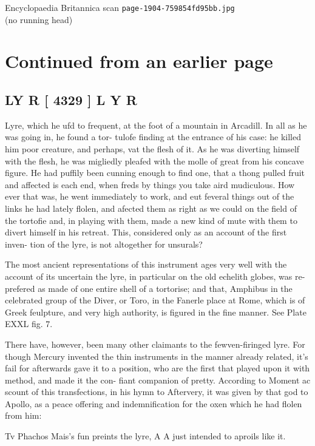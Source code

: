 \documentclass{article}
\begin{document}
\begin{center}
{\Large Encyclopaedia Britannica scan \texttt{page-1904-759854fd95bb.jpg}}\\[0.5em]
(no running head)
\end{center}
\section*{Continued from an earlier page}
\subsection*{LY R [ 4329 ] L Y R}
Lyre, which he ufd to frequent, at the foot of a mountain in Arcadill. In all as he was going in, he found a tor- tulofe finding at the entrance of his case: he killed him poor creature, and perhaps, vat the flesh of it. As he was diverting himself with the flesh, he was migliedly pleafed with the molle of great from his concave figure. He had puffily been cunning enough to find one, that a thong pulled fruit and affected is each end, when freds by things you take aird mudiculous. How ever that was, he went immediately to work, and eut feveral things out of the links he had lately flolen, and afected them as right as we could on the field of the tortofie and, in playing with them, made a new kind of mute with them to divert himself in his retreat. This, considered only as an account of the first inven- tion of the lyre, is not altogether for unsurals?

The most ancient representations of this instrument ages very well with the account of its uncertain the lyre, in particular on the old echelith globes, was re- prefered as made of one entire shell of a tortorise; and that, Amphibus in the celebrated group of the Diver, or Toro, in the Fanerle place at Rome, which is of Greek feulpture, and very high authority, is figured in the fine manner. See Plate EXXL fig. 7.

There have, however, been many other claimants to the fewven-firinged lyre. For though Mercury invented the thin instruments in the manner already related, it's fail for afterwards gave it to a position, who are the first that played upon it with method, and made it the con- fiant companion of pretty. According to Moment ac scount of this transfections, in his hymn to Aftervery, it was given by that god to Apollo, as a peace offering and indemnification for the oxen which he had flolen from him:

Tv Phachos Mais’s fun preints the lyre, A A just intended to aproils like it.
\end{document}
